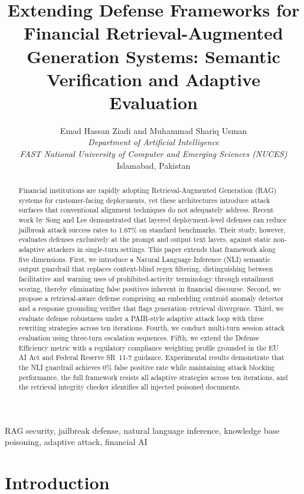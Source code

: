 \documentclass[journal,10pt]{IEEEtran}
\title{Extending Defense Frameworks for Financial Retrieval-Augmented Generation Systems: Semantic Verification and Adaptive Evaluation}
\author{Emad Hassan Ziadi and Muhammad Shariq Usman\\
\textit{Department of Artificial Intelligence}\\
\textit{FAST National University of Computer and Emerging Sciences (NUCES)}\\
Islamabad, Pakistan}
\begin{document}
\maketitle

\begin{abstract}
Financial institutions are rapidly adopting Retrieval-Augmented Generation (RAG) systems for customer-facing deployments, yet these architectures introduce attack surfaces that conventional alignment techniques do not adequately address. Recent work by Song and Lee demonstrated that layered deployment-level defenses can reduce jailbreak attack success rates to 1.67\% on standard benchmarks. Their study, however, evaluates defenses exclusively at the prompt and output text layers, against static non-adaptive attackers in single-turn settings. This paper extends that framework along five dimensions. First, we introduce a Natural Language Inference (NLI) semantic output guardrail that replaces context-blind regex filtering, distinguishing between facilitative and warning uses of prohibited-activity terminology through entailment scoring, thereby eliminating false positives inherent in financial discourse. Second, we propose a retrieval-aware defense comprising an embedding centroid anomaly detector and a response grounding verifier that flags generation--retrieval divergence. Third, we evaluate defense robustness under a PAIR-style adaptive attack loop with three rewriting strategies across ten iterations. Fourth, we conduct multi-turn session attack evaluation using three-turn escalation sequences. Fifth, we extend the Defense Efficiency metric with a regulatory compliance weighting profile grounded in the EU AI Act and Federal Reserve SR~11-7 guidance. Experimental results demonstrate that the NLI guardrail achieves 0\% false positive rate while maintaining attack blocking performance, the full framework resists all adaptive strategies across ten iterations, and the retrieval integrity checker identifies all injected poisoned documents.
\end{abstract}

\begin{IEEEkeywords}
RAG security, jailbreak defense, natural language inference, knowledge base poisoning, adaptive attack, financial AI
\end{IEEEkeywords}

\section{Introduction}
\end{document}
